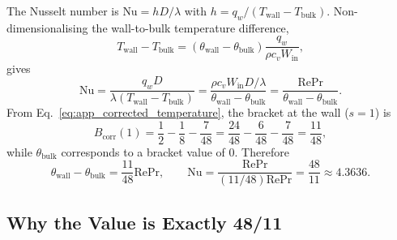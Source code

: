 \documentclass[12pt,a4paper]{article}
\newcommand{\Rey}{\text{Re}}
\newcommand{\Pran}{\text{Pr}}
\begin{document}
The Nusselt number is $\text{Nu}=hD/\lambda$ with
$h=q_w/(T_{\text{wall}}-T_{\text{bulk}})$. Non-dimensionalising the wall-to-bulk temperature
difference,
\begin{equation}
    T_{\text{wall}}-T_{\text{bulk}}
    = \left(\theta_{\text{wall}}-\theta_{\text{bulk}}\right)
      \frac{q_w}{\rho c_v W_{\text{in}}},
\end{equation}
gives
\begin{equation}
    \text{Nu} =
    \frac{q_w D}{\lambda\left(T_{\text{wall}}-T_{\text{bulk}}\right)}
    =
    \frac{\rho c_v W_{\text{in}}D/\lambda}{\theta_{\text{wall}}-\theta_{\text{bulk}}}
    =
    \frac{\Rey\Pran}{\theta_{\text{wall}}-\theta_{\text{bulk}}}.
    \label{eq:app_nusselt_def}
\end{equation}
From Eq.~\eqref{eq:app_corrected_temperature}, the bracket at the wall ($s=1$) is
\begin{equation}
    B_{\text{corr}}(1) = \frac12-\frac18-\frac{7}{48}
    = \frac{24}{48}-\frac{6}{48}-\frac{7}{48}
    = \frac{11}{48},
\end{equation}
while $\theta_{\text{bulk}}$ corresponds to a bracket value of $0$. Therefore
\begin{equation}
    \theta_{\text{wall}}-\theta_{\text{bulk}}
    = \frac{11}{48}\Rey\Pran,
    \qquad
    \text{Nu} = \frac{\Rey\Pran}{(11/48)\Rey\Pran} = \frac{48}{11} \approx 4.3636 .
    \label{eq:app_nusselt_corr}
\end{equation}

\subsection{Why the Value is Exactly 48/11}
\end{document}
